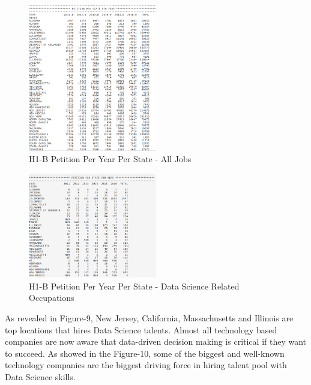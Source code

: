 \documentclass[9pt,twocolumn,twoside]{styles/osajnl}
\begin{document}
\begin{figure}[H]
  \centering
  \includegraphics[width=0.5\textwidth]{images/image13} 
       \vspace{-1em}
  \caption{H1-B Petition Per Year Per State - All Jobs}
       \vspace{-1em}
  \end{figure}

\begin{figure}[H]
  \centering
  \includegraphics[width=0.5\textwidth]{images/image18}
     \vspace{-1em}
  \caption{H1-B Petition Per Year Per State - Data Science Related Occupations}
     \vspace{-1em}
  \end{figure}

As revealed in Figure-9, New Jersey, California, Massachusetts and Illinois are top locations that hires Data Science talents. Almost all technology based companies are now aware that data-driven decision making is critical if they want to succeed. As showed in the Figure-10, some of the biggest and well-known technology companies are the biggest driving force in hiring talent pool with Data Science skills. 
\end{document}
